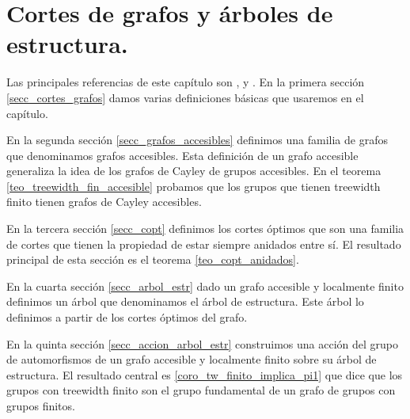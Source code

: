 \documentclass[tesis.tex]{subfiles}
\begin{document}
	
\chapter{Cortes de grafos y árboles de estructura.}

Las principales referencias de este capítulo son \cite{diekert2013context}, \cite{thomassen1993vertex} y \cite{kron2010cutting}.
En la primera sección \ref{secc_cortes_grafos} damos varias definiciones básicas que usaremos en el capítulo. 

En la segunda sección \ref{secc_grafos_accesibles} definimos una familia de grafos que denominamos grafos accesibles.
Esta definición de un grafo accesible generaliza la idea de los grafos de Cayley de grupos accesibles.
En el teorema \ref{teo_treewidth_fin_accesible} probamos que los grupos que tienen treewidth finito tienen grafos de Cayley accesibles. 

En la tercera sección \ref{secc_copt} definimos los cortes óptimos que son una familia de cortes que tienen la propiedad de estar siempre anidados entre sí.
El resultado principal de esta sección es el teorema \ref{teo_copt_anidados}.

En la cuarta sección \ref{secc_arbol_estr} dado un grafo accesible y localmente finito definimos un árbol que denominamos el árbol de estructura.
Este árbol lo definimos a partir de los cortes óptimos del grafo.

En la quinta sección \ref{secc_accion_arbol_estr} construimos una acción del grupo de automorfismos de un grafo accesible y localmente finito sobre su árbol de estructura.
El resultado central es \ref{coro_tw_finito_implica_pi1} que dice que los grupos con treewidth finito son el grupo fundamental de un grafo de grupos con grupos finitos.



%
\end{document}
